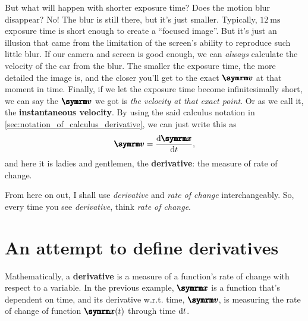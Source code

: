 But what will happen with shorter exposure time? Does the motion blur disappear? No! The blur is still there, but it's just smaller. Typically, $\qty{12}{\ms}$ exposure time is short enough to create a ``focused image''. But it's just an illusion that came from the limitation of the screen's ability to reproduce such little blur. If our camera and screen is good enough, we can \emph{always} calculate the velocity of the car from the blur. The smaller the exposure time, the more detailed the image is, and the closer you'll get to the exact $\vv{v}$ at that moment in time. Finally, if we let the exposure time become infinitesimally short, we can say the $\vv{v}$ we got is \emph{the velocity at that exact point}. Or as we call it, the \textbf{instantaneous velocity}. By using the said calculus notation in \cref{sec:notation_of_calculus_derivative}, we can just write this as
\begin{equation}
    \vv{v} = \odv{\vv{x}}{t}, \label{eq:first_intro_to_derivative}
\end{equation}
and here it is ladies and gentlemen, the \textbf{derivative}: the measure of rate of change.

From here on out, I shall use \emph{derivative} and \emph{rate of change} interchangeably. So, every time you see \emph{derivative}, think \emph{rate of change}.

\section{An attempt to define derivatives}

Mathematically, a \textbf{derivative} is a measure of a function's rate of change with respect to a variable. In the previous example, $\vv{x}$ is a function that's dependent on time, and its derivative w.r.t. time, $\vv{v}$, is measuring the rate of change of function $\vv{x}(t)$ through time $\odif{t}$.

